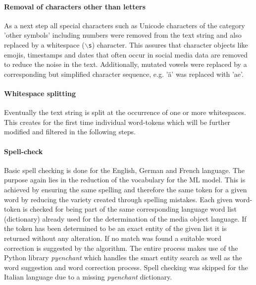 \paragraph*{Removal of characters other than letters} \label{remove_eveything_but_letters}
As a next step all special characters such as Unicode characters of the category 'other symbols' including numbers were removed from the text string and also replaced by a whitespace (\texttt{$\backslash$s}) character. This assures that character objects like emojis, timestamps and dates that often occur in social media data are removed to reduce the noise in the text. Additionally, mutated vowels were replaced by a corresponding but simplified character sequence, e.g. '\"a' was replaced with 'ae'.

\paragraph*{Whitespace splitting} \label{whitespace_splitting}
Eventually the text string is split at the occurrence of one or more whitespaces. This creates for the first time individual word-tokens which will be further modified and filtered in the following steps.

\paragraph*{Spell-check} \label{spell_check}
Basic spell checking is done for the English, German and French language. The purpose again lies in the reduction of the vocabulary for the ML model. This is achieved by ensuring the same spelling and therefore the same token for a given word by reducing the variety created through spelling mistakes. Each given word-token is checked for being part of the same corresponding language word list (dictionary) already used for the determination of the media object language. If the token has been determined to be an exact entity of the given list it is returned without any alteration. If no match was found a suitable word correction is suggested by the algorithm. The entire process makes use of the Python library \textit{pyenchant} which handles the smart entity search as well as the word suggestion and word correction process. Spell checking was skipped for the Italian language due to a missing \textit{pyenchant} dictionary.


